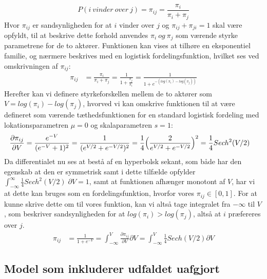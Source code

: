 \documentclass[11pt,a4paper]{article}
\begin{document}
\begin{equation}
P(i\ vinder\ over\ j) = \pi_{ij} = \frac{\pi_i}{\pi_i+\pi_j}
\end{equation}
Hvor $\pi_{ij}$ er sandsynligheden for at $i$ vinder over $j$ og $\pi_{ij}+\pi_{ji} = 1$ skal være opfyldt, til at beskrive dette forhold anvendes $\pi_i \ og \ \pi_j$ som værende styrke parametrene for de to aktører.
Funktionen kan vises at tilhøre en eksponentiel familie, og nærmere beskrives med en logistisk fordelingsfunktion, hvilket ses ved omskrivningen af $\pi_{ij}$:\\
\begin{align*}
\pi_{ij} &= \frac{\pi_i}{\pi_i+\pi_j}=\frac{1}{1+\frac{\pi_j}{\pi_i}}=\frac{1}{1+e^{-(log(\pi_i)-log(\pi_j))}}   
\end{align*}
Herefter kan vi definere styrkeforskellen mellem de to aktører som $V = log(\pi_i)-log(\pi_j)$, hvorved vi kan omskrive funktionen til at være defineret som værende tæthedsfunktionen for en standard logistisk fordeling med lokationsparametren $\mu = 0$ og skalaparametren $s = 1$:
\begin{align*}
\frac{\partial \pi_{ij}}{\partial V} &= \frac{e^{-V}}{(e^{-V}+1)^2} = \frac{1}{(e^{V/2}+e^{-V/2})^2} = \frac{1}{4}\Big{(}\frac{2}{e^{V/2}+e^{-V/2}}\Big{)}^2 = \frac{1}{4}Sech^2(V/2)    
\end{align*}
Da differentialet nu ses at bestå af en hyperbolsk sekant, som både har den egenskab at den er symmetrisk samt i dette tilfælde opfylder $\int_{-\infty}^{\infty} \frac{1}{4}Sech^2(V/2) \; \partial V = 1$, samt at funktionen afhænger monotont af $V$, har vi at dette kan bruges som en fordelingsfunktion, hvorfor vores $\pi_{ij} \in [0,1]$. For at kunne skrive dette om til vores funktion, kan vi altså tage integralet fra $-\infty$ til $V$, som beskriver sandsynligheden for at $log(\pi_i) > log(\pi_j)$, altså at $i$ præfereres over $j$.
\begin{align*}
\pi_{ij} &= \frac{1}{1+e^{-V}} = \int_{-\infty}^{V} \frac{\partial \pi_{ij}}{\partial V} \partial V = \int_{-\infty}^{V} \frac{1}{4}Sech(V/2) \partial V    
\end{align*}
\subsection{Model som inkluderer udfaldet uafgjort}
\end{document}
